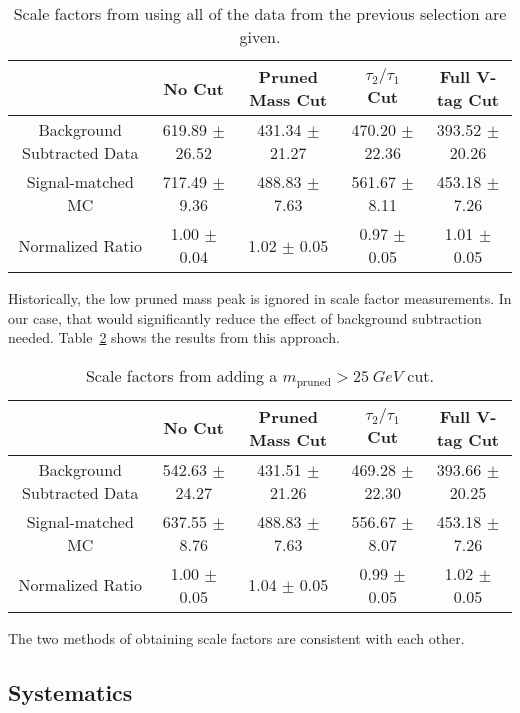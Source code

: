 \documentclass{article}
\begin{document}
\begin{table}[h]
  \caption{Scale factors from using all of the data from the previous selection are given.}
  \begin{tabular}{c | c | c | c | c}
    \hline
    & No Cut & Pruned Mass Cut & $\tau_2/\tau_1$ Cut & Full V-tag Cut \\
    \hline
    Background Subtracted Data & 619.89 $\pm$ 26.52 & 431.34 $\pm$ 21.27 & 470.20 $\pm$ 22.36 & 393.52 $\pm$ 20.26 \\
    Signal-matched MC & 717.49 $\pm$ 9.36 & 488.83 $\pm$ 7.63 & 561.67 $\pm$ 8.11 & 453.18 $\pm$ 7.26 \\
    \hline
    Normalized Ratio & 1.00 $\pm$ 0.04 & 1.02 $\pm$ 0.05 & 0.97 $\pm$ 0.05 & 1.01 $\pm$ 0.05 \\
    \hline
  \end{tabular}
  \label{tab:wscale_res}
\end{table}

Historically, the low pruned mass peak is ignored in scale factor measurements. 
In our case, that would significantly reduce the effect of background subtraction needed.
Table~\ref{tab:wscale_hmm} shows the results from this approach.

\begin{table}[h]
  \caption{Scale factors from adding a $m_\text{pruned} > \SI{25}{GeV}$ cut.}
  \begin{tabular}{c | c | c | c | c}
    \hline
    & No Cut & Pruned Mass Cut & $\tau_2/\tau_1$ Cut & Full V-tag Cut \\
    \hline
    Background Subtracted Data & 542.63 $\pm$ 24.27 & 431.51 $\pm$ 21.26 & 469.28 $\pm$ 22.30 & 393.66 $\pm$ 20.25 \\
    Signal-matched MC & 637.55 $\pm$ 8.76 & 488.83 $\pm$ 7.63 & 556.67 $\pm$ 8.07 & 453.18 $\pm$ 7.26 \\
    \hline
    Normalized Ratio & 1.00 $\pm$ 0.05 & 1.04 $\pm$ 0.05 & 0.99 $\pm$ 0.05 & 1.02 $\pm$ 0.05 \\
    \hline
  \end{tabular}
  \label{tab:wscale_hmm}
\end{table}

The two methods of obtaining scale factors are consistent with each other.

\subsection{Systematics}
\end{document}
